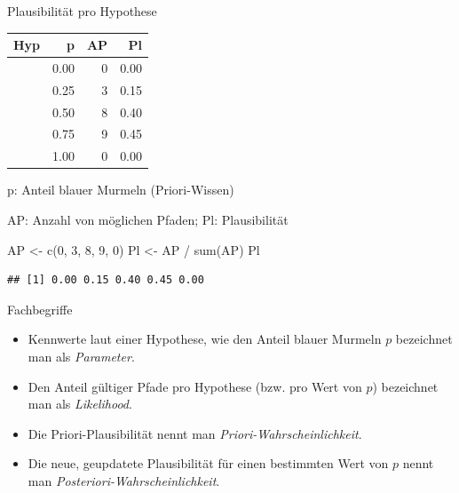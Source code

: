 \documentclass[
  ngerman,
  ignorenonframetext,
]{beamer}
\newenvironment{Shaded}{\begin{snugshade}}{\end{snugshade}}
\newcommand{\DecValTok}[1]{\textcolor[rgb]{0.00,0.00,0.81}{#1}}
\newcommand{\FunctionTok}[1]{\textcolor[rgb]{0.00,0.00,0.00}{#1}}
\newcommand{\NormalTok}[1]{#1}
\newcommand{\OtherTok}[1]{\textcolor[rgb]{0.56,0.35,0.01}{#1}}
\newcommand{\SpecialCharTok}[1]{\textcolor[rgb]{0.00,0.00,0.00}{#1}}
\begin{document}
\begin{frame}[fragile]{Plausibilität pro Hypothese}
\protect\hypertarget{plausibilituxe4t-pro-hypothese}{}
\begin{tabular}{l|r|r|r}
\hline
Hyp & p & AP & Pl\\
\hline
[W W W W] & 0.00 & 0 & 0.00\\
\hline
[B W W W] & 0.25 & 3 & 0.15\\
\hline
[B B W W] & 0.50 & 8 & 0.40\\
\hline
[B B B W] & 0.75 & 9 & 0.45\\
\hline
[B B B B] & 1.00 & 0 & 0.00\\
\hline
\end{tabular}

p: Anteil blauer Murmeln (Priori-Wissen)

AP: Anzahl von möglichen Pfaden; Pl: Plausibilität

\begin{Shaded}
\begin{Highlighting}[]
\NormalTok{AP }\OtherTok{\textless{}{-}} \FunctionTok{c}\NormalTok{(}\DecValTok{0}\NormalTok{, }\DecValTok{3}\NormalTok{, }\DecValTok{8}\NormalTok{, }\DecValTok{9}\NormalTok{, }\DecValTok{0}\NormalTok{)}
\NormalTok{Pl }\OtherTok{\textless{}{-}}\NormalTok{ AP }\SpecialCharTok{/} \FunctionTok{sum}\NormalTok{(AP)}
\NormalTok{Pl}
\end{Highlighting}
\end{Shaded}

\begin{verbatim}
## [1] 0.00 0.15 0.40 0.45 0.00
\end{verbatim}
\end{frame}

\begin{frame}{Fachbegriffe}
\protect\hypertarget{fachbegriffe}{}
\begin{itemize}
\item
  Kennwerte laut einer Hypothese, wie den Anteil blauer Murmeln \(p\)
  bezeichnet man als \emph{Parameter}.
\item
  Den Anteil gültiger Pfade pro Hypothese (bzw. pro Wert von \(p\))
  bezeichnet man als \emph{Likelihood}.
\item
  Die Priori-Plausibilität nennt man \emph{Priori-Wahrscheinlichkeit}.
\item
  Die neue, geupdatete Plausibilität für einen bestimmten Wert von \(p\)
  nennt man \emph{Posteriori-Wahrscheinlichkeit}.
\end{itemize}
\end{frame}
\end{document}
